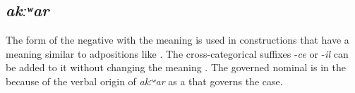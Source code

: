 
\subsection{\textit{akːʷar} }
\label{ssec:postposition akwar}

The  form of the negative  with the meaning  is used in constructions that have a meaning similar to adpositions like . The cross-categorical suffixes -\textit{ce} or -\textit{il} can be added to it without changing the meaning . The governed nominal is in the  because of the verbal origin of \textit{akːʷar} as a  that governs the  case.

